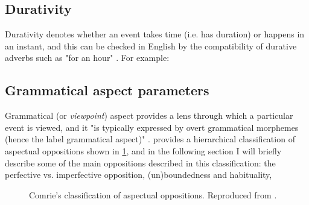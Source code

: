 \subsection*{Durativity}
Durativity denotes whether an event takes time (i.e. has duration) or happens in an instant, and this can be checked in English by the compatibility of durative adverbs such as "for an hour" \citep{102998}. For example:
\begin{exe}
\end{exe}

\subsection{Grammatical aspect parameters}
Grammatical (or \emph{viewpoint}) aspect provides a lens through which a particular event is viewed, and it "is typically expressed by overt grammatical morphemes (hence the label grammatical aspect)" \citep{Chapter1IntroductionCrossLinguisticPerspectivesontheSemanticsofGrammaticalAspect}. \citet{comrie1976aspect} provides a hierarchical classification of aspectual oppositions shown in \ref{fig:comrieaspecttree}, and in the following section I will briefly describe some of the main oppositions described in this classification: the perfective vs. imperfective opposition, (un)boundedness and habituality, 

\begin{figure}
    \centering
    \caption[Comrie's classification of aspectual oppositions]{Comrie's classification of aspectual oppositions. Reproduced from \citet{comrie1976aspect}.}
    \label{fig:comrieaspecttree}
\end{figure}

